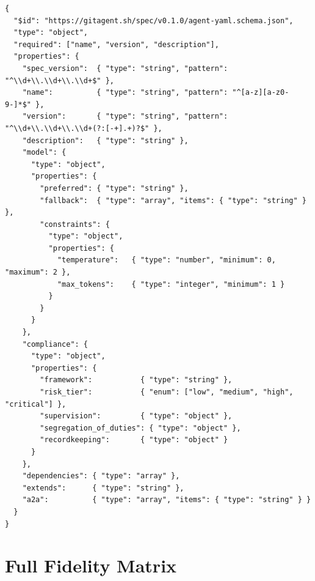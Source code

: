 \documentclass[11pt,a4paper]{article}
\begin{document}
\begin{lstlisting}[basicstyle=\ttfamily\scriptsize]
{
  "$id": "https://gitagent.sh/spec/v0.1.0/agent-yaml.schema.json",
  "type": "object",
  "required": ["name", "version", "description"],
  "properties": {
    "spec_version":  { "type": "string", "pattern": "^\\d+\\.\\d+\\.\\d+$" },
    "name":          { "type": "string", "pattern": "^[a-z][a-z0-9-]*$" },
    "version":       { "type": "string", "pattern": "^\\d+\\.\\d+\\.\\d+(?:[-+].+)?$" },
    "description":   { "type": "string" },
    "model": {
      "type": "object",
      "properties": {
        "preferred": { "type": "string" },
        "fallback":  { "type": "array", "items": { "type": "string" } },
        "constraints": {
          "type": "object",
          "properties": {
            "temperature":   { "type": "number", "minimum": 0, "maximum": 2 },
            "max_tokens":    { "type": "integer", "minimum": 1 }
          }
        }
      }
    },
    "compliance": {
      "type": "object",
      "properties": {
        "framework":           { "type": "string" },
        "risk_tier":           { "enum": ["low", "medium", "high", "critical"] },
        "supervision":         { "type": "object" },
        "segregation_of_duties": { "type": "object" },
        "recordkeeping":       { "type": "object" }
      }
    },
    "dependencies": { "type": "array" },
    "extends":      { "type": "string" },
    "a2a":          { "type": "array", "items": { "type": "string" } }
  }
}
\end{lstlisting}

\section{Full Fidelity Matrix}\label{app:fidelity}
\end{document}
